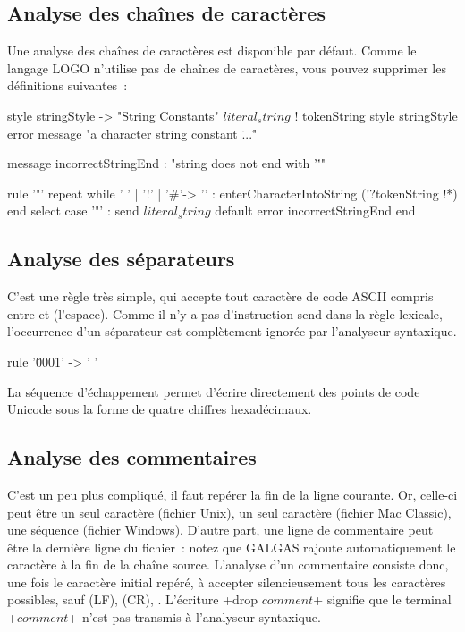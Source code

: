 \subsection{Analyse des chaînes de caractères}
Une analyse des chaînes de caractères est disponible par défaut. Comme le langage LOGO n’utilise pas de chaînes de caractères, vous pouvez supprimer les définitions suivantes~:

\begin{galgas3}
style stringStyle -> "String Constants"
$literal_string$ ! tokenString style stringStyle %
                   error message "a character string constant \"...\""

message incorrectStringEnd : "string does not end with '\"'"

rule '"' {
  repeat
  while ' ' | '!' | '#'-> '\uFFFD' :
    enterCharacterIntoString (!?tokenString !*)
  end
  select
  case '"' :
    send $literal_string$
  default
    error incorrectStringEnd
  end
}
\end{galgas3}

\subsection{Analyse des séparateurs}
C'est une règle très simple, qui accepte tout caractère de code ASCII compris entre  et  (l'espace). Comme il n'y a pas d'instruction send dans la règle lexicale, l'occurrence d'un séparateur est complètement ignorée par l'analyseur syntaxique.
\begin{galgas3}
rule '\u0001' -> ' ' {
}
\end{galgas3}
La séquence d'échappement  permet d'écrire directement des points de code Unicode sous la forme de quatre chiffres hexadécimaux.

\subsection{Analyse des commentaires}
C'est un peu plus compliqué, il faut repérer la fin de la ligne courante. Or, celle-ci peut être un seul caractère  (fichier Unix), un seul caractère  (fichier Mac Classic), une séquence  (fichier Windows). D'autre part, une ligne de commentaire peut être la dernière ligne du fichier~: notez que GALGAS rajoute automatiquement le caractère \tpp{\textquotesingle\textbackslash 0\textquotesingle} à la fin de la chaîne source. L'analyse d'un commentaire consiste donc, une fois le caractère initial \tpp{\textquotesingle\textbackslash\#\textquotesingle} repéré, à accepter silencieusement tous les caractères possibles, sauf  (LF),  (CR), . L’écriture \ggst+drop $comment$+ signifie que le terminal \ggst+$comment$+ n’est pas transmis à l’analyseur syntaxique.

